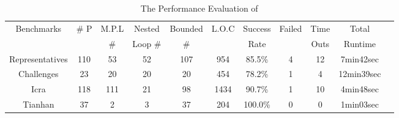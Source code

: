 \begin{table}[H]
 \vspace{-1cm}
\caption{The Performance Evaluation of {\THESYSTEM}}
\label{tb:performance-eval}
    \centering
{\scriptsize
\begin{tabular}{ | c | c | c | c | c | c | c | c | c | c | c |}
\hline
\multirow{2}{*}{Benchmarks} & \multirow{2}{*}{\# P}  & {M.P.L} & Nested  & {Bounded} & L.O.C & {Success} & \multirow{2}{*}{Failed} & Time  & Total
\\
&  & \# & Loop \# & \# & & Rate &  & Outs &   Runtime \\
\hline {Representatives} & {110}  & 53  & 52  & 107 & 954 & 85.5\% & 4 & 12 & 7min42sec \\
\hline
Challenges & 23  & 20 & 20 & {20} & 454 & {78.2\%}  & 1 & 4 & {12min39sec} \\
\hline
{Icra} & 118 & 111 & 21 & 98 & 1434  & 90.7\% & 1 & 10 & {4min48sec} \\
\hline
Tianhan & 37 & 2 & 3 & 37 & 204 & 100.0\% & 0 & 0 & 1min03sec \\
\hline
\end{tabular}    
}
 \vspace{-0.8cm}
\end{table}